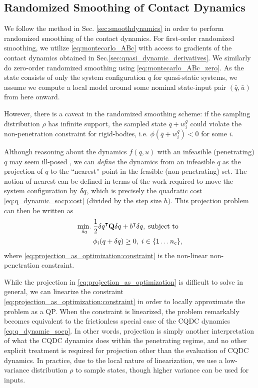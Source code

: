 \subsection{Randomized Smoothing of Contact Dynamics} \label{sec:randomizedmoothing}
We follow the method in Sec. \ref{sec:smoothdynamics} in order to perform randomized smoothing of the contact dynamics. For first-order randomized smoothing, we utilize \eqref{eq:montecarlo_ABc} with access to gradients of the contact dynamics obtained in Sec.\ref{sec:quasi_dynamic_derivatives}. We similarly do zero-order randomized smoothing using \eqref{eq:montecarlo_ABc_zero}. As the state consists of only the system configuration $q$ for quasi-static systems, we assume we compute a local model around some nominal state-input pair $(\bar{q},\bar{u})$ from here onward.

However, there is a caveat in the randomized smoothing scheme: if the sampling distribution $\rho$ has infinite support, the sampled state $\bar{q} + w^q_i$ could violate the non-penetration constraint for rigid-bodies, i.e. $\phi(\bar{q} + w^q_i) < 0$ for some $i$.

Although reasoning about the dynamics $f(q, u)$ with an infeasible (penetrating) $q$ may seem ill-posed \cite{contactkalmanfilter}, we can \emph{define} the dynamics from an infeasible $q$ as the projection of $q$ to the ``nearest'' point in the feasible (non-penetrating) set. The notion of nearest can be defined in terms of the work required to move the system configuration by ${\delta q}$, which is precisely the quadratic cost \eqref{eq:q_dynamic_socp:cost} (divided by the step size $h$). This projection problem can then be written as
\begin{subequations}
\label{eq:projection_as_optimization}
\begin{align}
\underset{{\delta q}}{\mathrm{min}.} \; &\frac{1}{2} {\delta q}^\intercal \mathbf{Q} {\delta q} + b^\intercal {\delta q}, \; \text{subject to} \\
& \phi_i(q + \delta q) \geq 0, \; i \in \{1 \dots n_\mathrm{c}\}, \label{eq:projection_as_optimization:constraint}
\end{align}
\end{subequations}
where \eqref{eq:projection_as_optimization:constraint} is the non-linear non-penetration constraint. 

While the projection in \eqref{eq:projection_as_optimization} is difficult to solve in general, we can linearize the constraint \eqref{eq:projection_as_optimization:constraint} in order to locally approximate the problem as a QP. When the constraint is linearized, the problem remarkably becomes equivalent to the frictionless special case of the CQDC dynamics \eqref{eq:q_dynamic_socp}. In other words, projection is simply another interpretation of what the CQDC dynamics does within the penetrating regime, and no other explicit treatment is required for projection other than the evaluation of CQDC dynamics. In practice, due to the local nature of linearization, we use a low-variance distribution $\rho$ to sample states, though higher variance can be used for inputs.

